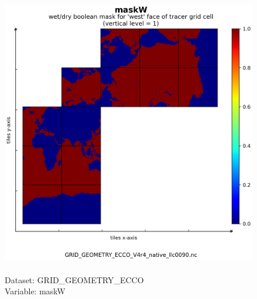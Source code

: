 \begin{figure}[H]
\centering
\includegraphics[scale=0.5]{../images/plots/native_plots_coords/Geometry_Parameters_for_the_Lat-Lon-Cap_90_(llc90)_Native_Model_Grid_(Version_4_Release_4)/maskW.png}
\caption{\\Dataset: GRID\_GEOMETRY\_ECCO\\Variable: maskW}
\label{tab:table-GRID_GEOMETRY_ECCO_maskW-Plot}
\end{figure}
\pagebreak
